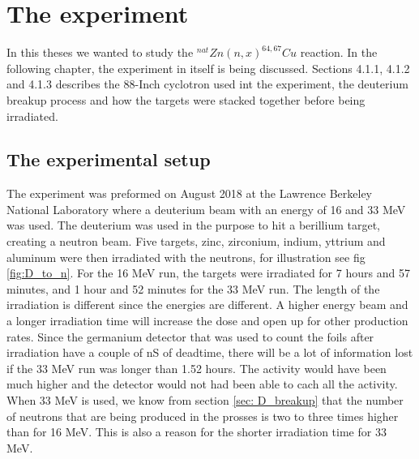 \documentclass[twoside,english]{uiofysmaster/uiofysmaster}
\begin{document}
\chapter{The experiment}
\label{ch: experiment}

In this theses we wanted to study the $^{nat}Zn(n,x)^{64,67}Cu$ reaction. 
In the following chapter, the experiment in itself is being discussed. Sections 4.1.1, 4.1.2 and 4.1.3 describes the 88-Inch cyclotron used int the experiment, the deuterium breakup process and how the targets were stacked together before being irradiated.


\section{The experimental setup}
\label{sec: setup}

The experiment was preformed on August 2018 at the Lawrence Berkeley National Laboratory where a deuterium beam with an energy of 16 and 33 MeV was used. The deuterium was used in the purpose to hit a berillium target, creating a neutron beam. Five targets, zinc, zirconium, indium, yttrium and aluminum were then irradiated with the neutrons, for illustration see fig \ref{fig:D_to_n}. For the 16 MeV run, the targets were irradiated for 7 hours and 57 minutes, and 1 hour and 52 minutes for the 33 MeV run. The length of the irradiation is different since the energies are different. A higher energy beam and a longer irradiation time will increase the dose and open up for other production rates. Since the germanium detector that was used to count the foils after irradiation have a couple of nS of deadtime, there will be a lot of information lost if the 33 MeV run was longer than 1.52 hours. The activity would have been much higher and the detector would not had been able to cach all the activity.\\ When 33 MeV is used, we know from section \ref{sec: D_breakup} that the number of neutrons that are being produced in the prosses is two to three times higher than for 16 MeV. This is also a reason for the shorter irradiation time for 33 MeV.
\end{document}
